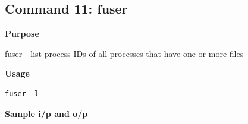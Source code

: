 \subsection{Command 11: fuser} 
\textbf{Purpose}
\begin{flushleft}
       fuser - list process IDs of all processes that have one or more files
\end{flushleft}
\textbf{Usage}
\begin{verbatim}
fuser -l
\end{verbatim}
\textbf{Sample i/p and o/p}
\begin{figure}[H] 
\end{figure}
